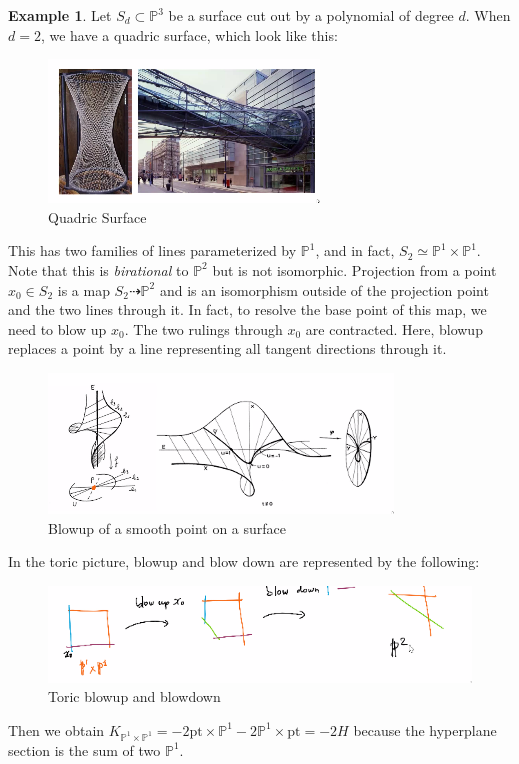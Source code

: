 \documentclass[leqno, openany]{memoir}
\theoremstyle{definition}
\newtheorem{exm}[thm]{Example}
\theoremstyle{remark}
\theoremstyle{plain}
\theoremstyle{definition}
\theoremstyle{remark}
\renewcommand{\P}{\mathbb{P}}
\newcommand{\mr}[1]{\mathrm{#1}}
\begin{document}
\begin{exm}
    Let $S_d \subset \P^3$ be a surface cut out by a polynomial of degree $d$. When $d = 2$, we have a quadric surface, which look like this:
    \begin{figure}[H]
        \centering
        \includegraphics[scale=0.8]{quadric}
        \caption{Quadric Surface}%
        \label{fig:quadric}
    \end{figure}
    This has two families of lines parameterized by $\P^1$, and in fact, $S_2 \simeq \P^1 \times \P^1$. Note that this is \textit{birational} to $\P^2$ but is not isomorphic. Projection from a point $x_0 \in S_2$ is a map $S_2 \dashrightarrow \P^2$ and is an isomorphism outside of the projection point and the two lines through it. In fact, to resolve the base point of this map, we need to blow up $x_0$. The two rulings through $x_0$ are contracted. Here, blowup replaces a point by a line representing all tangent directions through it.
    \begin{figure}[H]
        \centering
        \includegraphics[scale=1]{blowup.png}
        \caption{Blowup of a smooth point on a surface}%
        \label{fig:blowup}
    \end{figure}
    In the toric picture, blowup and blow down are represented by the following:
    \begin{figure}[H]
        \centering
        \includegraphics[scale=0.8]{Toric}
        \caption{Toric blowup and blowdown}%
        \label{fig:Toric}
    \end{figure}
    Then we obtain $K_{\P^1 \times \P^1} = -2 \mr{pt} \times \P^1 - 2 \P^1 \times \mr{pt} = -2H$ because the hyperplane section is the sum of two $\P^1$. 
\end{exm}
\end{document}

